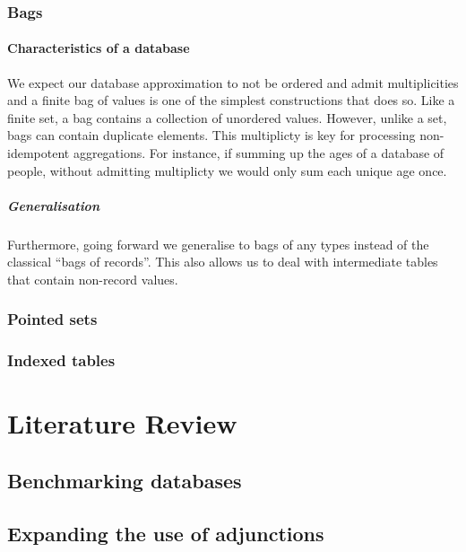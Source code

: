 \subsubsection{Bags}
\paragraph{Characteristics of a database}We expect our database approximation to not be ordered and admit multiplicities and a finite bag of values is one of the simplest constructions that does so. Like a finite set, a bag contains a collection of unordered values. However, unlike a set, bags can contain duplicate elements. \cite{RelationalAlgebraByWayOfAdjunctions} This multiplicty is key for processing non-idempotent aggregations. For instance, if summing up the ages of a database of people, without admitting multiplicty we would only sum each unique age once.
\subparagraph{Generalisation}Furthermore, going forward we generalise to bags of any types instead of the classical ``bags of records''. This also allows us to deal with intermediate tables that contain non-record values.

\subsubsection{Pointed sets}
\subsubsection{Indexed tables}

\section{Literature Review}
\subsection{Benchmarking databases}
\subsection{Expanding the use of adjunctions}